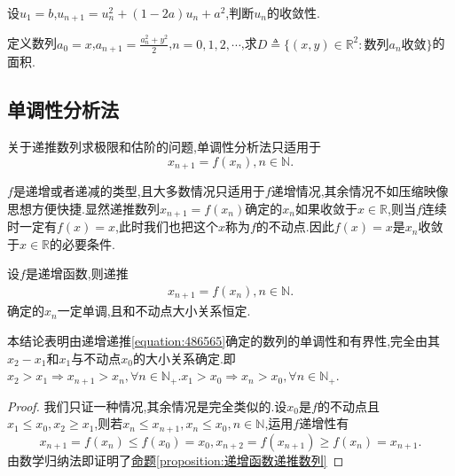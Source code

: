 \documentclass[lang=cn,newtx,10pt,scheme=chinese]{elegantbook}
\begin{document}
\begin{example}
   设\(u_1 = b\),\(u_{n + 1}=u_{n}^{2}+(1 - 2a)u_{n}+a^{2}\),判断\(u_{n}\)的收敛性.
\end{example}
\begin{solution}
   
\end{solution}

\begin{example}
   定义数列\(a_0 = x\),\(a_{n + 1}=\frac{a_{n}^{2}+y^{2}}{2}\),\(n = 0,1,2,\cdots\),求\(D\triangleq\{(x,y)\in\mathbb{R}^2:\text{数列}a_n\text{收敛}\}\)的面积.
\end{example}
\begin{solution}
   
\end{solution}


\begin{example}
   
\end{example}
\begin{solution}
   
\end{solution}




\subsection{单调性分析法}
关于递推数列求极限和估阶的问题,单调性分析法只适用于
\[
x_{n + 1} = f(x_n),n \in \mathbb{N}.
\]

\(f\)是递增或者递减的类型,且大多数情况只适用于\(f\)递增情况,其余情况不如压缩映像思想方便快捷.显然递推数列$x_{n + 1} = f(x_n)$确定的\(x_n\)如果收敛于\(x \in \mathbb{R}\),则当\(f\)连续时一定有\(f(x) = x\),此时我们也把这个\(x\)称为\(f\)的不动点.因此\(f(x) = x\)是\(x_n\)收敛于\(x \in \mathbb{R}\)的必要条件.



\begin{proposition}[递增函数递推数列]\label{proposition:递增函数递推数列}
设\(f\)是递增函数,则递推
\begin{align}\label{equation:486565}
   x_{n + 1} = f(x_n),n \in \mathbb{N}.
\end{align}
确定的\(x_n\)一定单调,且和不动点大小关系恒定.
\end{proposition}
\begin{note}
   本结论表明由递增递推\eqref{equation:486565}确定的数列的单调性和有界性,完全由其\(x_2 - x_1\)和\(x_1\)与不动点$x_0$的大小关系确定.即$x_2>x_1\Rightarrow x_{n+1}>x_n,\forall n\in \mathbb{N} _+.x_1>x_0\Rightarrow x_n>x_0,\forall n\in \mathbb{N} _+$.
\end{note}
\begin{proof}
   我们只证一种情况,其余情况是完全类似的.设\(x_0\)是\(f\)的不动点且\(x_1\leq x_0,x_2\geq x_1\),则若\(x_n\leq x_{n + 1},x_n\leq x_0,n\in\mathbb{N}\),运用\(f\)递增性有
\[
x_{n + 1} = f(x_n)\leq f(x_0) = x_0,x_{n + 2} = f(x_{n + 1})\geq f(x_n) = x_{n + 1}.
\]
由数学归纳法即证明了\hyperref[proposition:递增函数递推数列]{命题\ref{proposition:递增函数递推数列}}
\end{proof}
\end{document}
